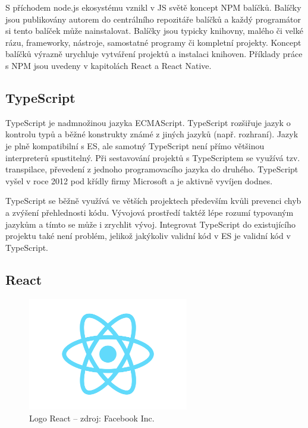 S příchodem node.js ekosystému vznikl v JS světě koncept NPM balíčků. Balíčky jsou publikovány autorem do centrálního repozitáře balíčků a každý programátor si tento balíček může nainstalovat. Balíčky jsou typicky knihovny, malého či velké rázu, frameworky, nástroje, samostatné programy či kompletní projekty. Koncept balíčků výrazně urychluje vytváření projektů a instalaci knihoven. Příklady práce s NPM jsou uvedeny v kapitolách React a React Native.

\subsection{TypeScript}

TypeScript je nadmnožinou jazyka ECMAScript. TypeScript rozšiřuje jazyk o kontrolu typů a běžné konstrukty známé z jiných jazyků \cite{freeman2019essential} (např. rozhraní). Jazyk je plně kompatibilní s ES, ale samotný TypeScript není přímo většinou interpreterů spustitelný. Při sestavování projektů s TypeScriptem se využívá tzv. transpilace, převedení z jednoho programovacího jazyka do druhého. TypeScript vyšel v roce 2012 pod křídly firmy Microsoft a je aktivně vyvíjen dodnes.

TypeScript se běžně využívá ve větších projektech především kvůli prevenci chyb a zvýšení přehlednosti kódu. Vývojová prostředí taktéž lépe rozumí typovaným jazykům a tímto se může i zrychlit vývoj. Integrovat TypeScript do existujícího projektu také není problém, jelikož jakýkoliv validní kód v ES je validní kód v TypeScript.

\subsection{React}

\begin{figure}
	\begin{center}
		\includegraphics[width=70mm]{img/react-logo.png}
	\end{center}
	\caption{Logo React -- zdroj: Facebook Inc.}
\end{figure}

